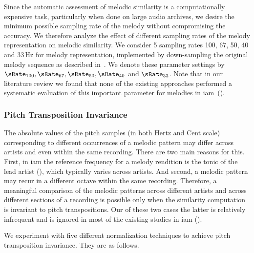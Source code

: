 Since the automatic assessment of melodic similarity is a computationally expensive task, particularly when done on large audio archives, we desire the minimum possible sampling rate of the melody without compromising the accuracy. We therefore analyze the effect of different sampling rates of the melody representation on melodic similarity. We consider 5 sampling rates 100, 67, 50, 40 and 33\,Hz for melody representation, implemented by down-sampling the original melody sequence as described in~. We denote these parameter settings by $\sRate_{100}, \sRate_{67}, \sRate_{50}, \sRate_{40}$ and $\sRate_{33}$. Note that in our literature review we found that none of the existing approaches performed a systematic evaluation of this important parameter for melodies in \gls{iam}~().

\subsubsection{Pitch Transposition Invariance}
\label{sec:patterns_melodic_similarity_transposition_invariance}

The absolute values of the pitch samples (in both Hertz and Cent scale) corresponding to different occurrences of a melodic pattern may differ across artists and even within the same recording. There are two main reasons for this. First, in \gls{iam} the reference frequency for a melody rendition is the tonic of the lead artist (), which typically varies across artists. And second, a melodic pattern may recur in a different octave within the same recording. Therefore, a meaningful comparison of the melodic patterns across different artists and across different sections of a recording is possible only when the similarity computation is invariant to pitch transpositions. Our of these two cases the latter is relatively infrequent and is ignored in most of the existing studies in \gls{iam} ().

We experiment with five different normalization techniques to achieve pitch transposition invariance. They are as follows. 

